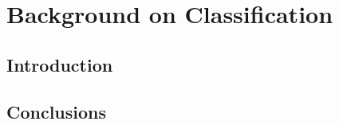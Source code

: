 \chapter{Background on Classification} \label{section:chapter4}
 
\section{Introduction}

\blindtext



\section{Conclusions}

\blindtext



